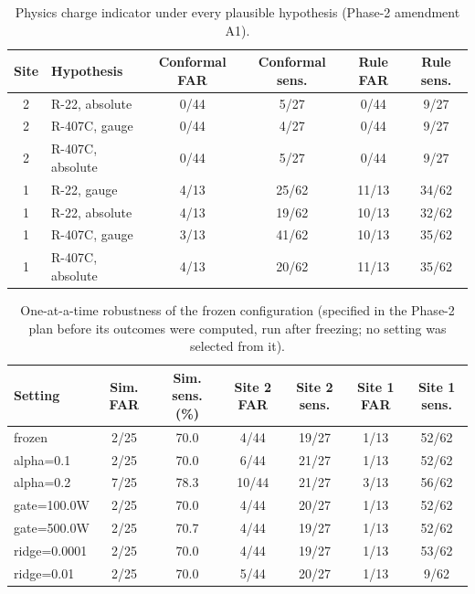\begin{table}[h!]\centering\footnotesize\caption{Physics charge indicator under every plausible hypothesis (Phase-2 amendment A1).}\label{tab:S4b}
\begin{tabular}{clcccc}\toprule
Site & Hypothesis & Conformal FAR & Conformal sens. & Rule FAR & Rule sens.\\\midrule
2 & R-22, absolute & 0/44 & 5/27 & 0/44 & 9/27\\
2 & R-407C, gauge & 0/44 & 4/27 & 0/44 & 9/27\\
2 & R-407C, absolute & 0/44 & 5/27 & 0/44 & 9/27\\
1 & R-22, gauge & 4/13 & 25/62 & 11/13 & 34/62\\
1 & R-22, absolute & 4/13 & 19/62 & 10/13 & 32/62\\
1 & R-407C, gauge & 3/13 & 41/62 & 10/13 & 35/62\\
1 & R-407C, absolute & 4/13 & 20/62 & 11/13 & 35/62\\
\bottomrule\end{tabular}\end{table}

\begin{table}[h!]\centering\footnotesize\caption{One-at-a-time robustness of the frozen configuration (specified in the Phase-2 plan before its outcomes were computed, run after freezing; no setting was selected from it).}\label{tab:S5}
\begin{tabular}{lcccccc}\toprule
Setting & Sim. FAR & Sim. sens. (\%) & Site 2 FAR & Site 2 sens. & Site 1 FAR & Site 1 sens.\\\midrule
frozen & 2/25 & 70.0 & 4/44 & 19/27 & 1/13 & 52/62\\
alpha=0.1 & 2/25 & 70.0 & 6/44 & 21/27 & 1/13 & 52/62\\
alpha=0.2 & 7/25 & 78.3 & 10/44 & 21/27 & 3/13 & 56/62\\
gate=100.0W & 2/25 & 70.0 & 4/44 & 20/27 & 1/13 & 52/62\\
gate=500.0W & 2/25 & 70.7 & 4/44 & 19/27 & 1/13 & 52/62\\
ridge=0.0001 & 2/25 & 70.0 & 4/44 & 19/27 & 1/13 & 53/62\\
ridge=0.01 & 2/25 & 70.0 & 5/44 & 20/27 & 1/13 & 9/62\\
\bottomrule\end{tabular}\end{table}

